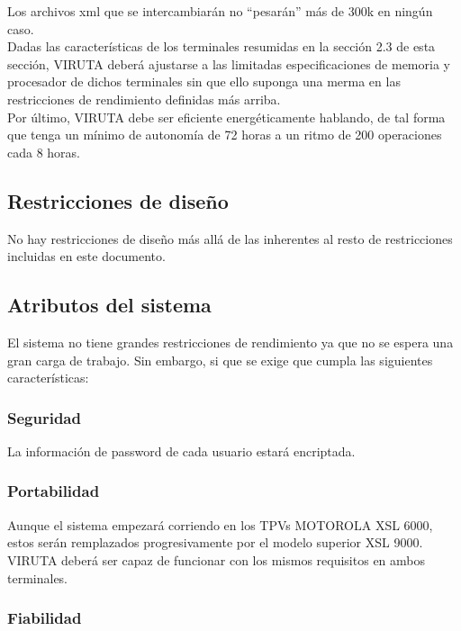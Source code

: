 Los archivos xml que se intercambiarán no ``pesarán'' más de 300k en ningún caso.\\

Dadas las características de los terminales resumidas en la sección 2.3 de esta sección, VIRUTA deberá ajustarse a las limitadas especificaciones de memoria y procesador de dichos terminales sin que ello suponga una merma en las restricciones de rendimiento definidas más arriba.\\

Por último, VIRUTA debe ser eficiente energéticamente hablando, de tal forma que tenga un mínimo de autonomía de \color{red} 72 horas \color{black} a un ritmo de 200 operaciones cada 8 horas.

\subsection{Restricciones de diseño}

No hay restricciones de diseño más allá de las inherentes al resto de restricciones incluidas en este documento.

\subsection{Atributos del sistema}

El sistema no tiene grandes restricciones de rendimiento ya que no se espera una gran carga de trabajo. Sin embargo, si que se exige que cumpla las siguientes características:

\subsubsection{Seguridad}

La información de password de cada usuario estará encriptada.

\subsubsection{Portabilidad}

\color{red} Aunque el sistema empezará corriendo en los TPVs MOTOROLA XSL 6000, estos serán remplazados progresivamente por el modelo superior XSL 9000. VIRUTA deberá ser capaz de funcionar con los mismos requisitos en ambos terminales. \color{black}

\subsubsection{Fiabilidad}


